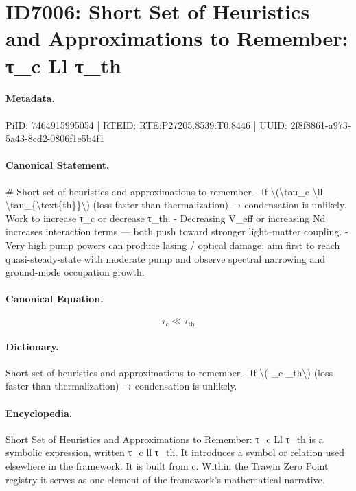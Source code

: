 \section*{ID7006: Short Set of Heuristics and Approximations to Remember: τ\_c Ll τ\_th}
\paragraph{Metadata.}
PiID: 7464915995054 | RTEID: RTE:P27205.8539:T0.8446 | UUID: 2f8f8861-a973-5a43-8cd2-0806f1e5b4f1

\paragraph{Canonical Statement.}
\# Short set of heuristics and approximations to remember - If \textbackslash{}(\textbackslash{}tau\_c \textbackslash{}ll \textbackslash{}tau\_\{\textbackslash{}text\{th\}\}\textbackslash{}) (loss faster than thermalization) → condensation is unlikely. Work to increase τ\_c or decrease τ\_th. - Decreasing V\_eff or increasing Nd increases interaction terms — both push toward stronger light–matter coupling. - Very high pump powers can produce lasing / optical damage; aim first to reach quasi-steady-state with moderate pump and observe spectral narrowing and ground-mode occupation growth.

\paragraph{Canonical Equation.}
\[
\tau_c \ll \tau_{\text{th}}
\]

\paragraph{Dictionary.}
Short set of heuristics and approximations to remember - If \textbackslash{}( \_c \_th\textbackslash{}) (loss faster than thermalization) → condensation is unlikely.

\paragraph{Encyclopedia.}
Short Set of Heuristics and Approximations to Remember: τ\_c Ll τ\_th is a symbolic expression, written τ\_c ll τ\_th. It introduces a symbol or relation used elsewhere in the framework. It is built from c. Within the Trawin Zero Point registry it serves as one element of the framework's mathematical narrative.
